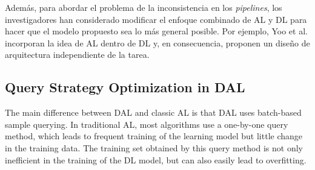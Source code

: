Además, para abordar el problema de la inconsistencia en los \textit{pipelines}, los investigadores han considerado modificar el enfoque combinado de AL y DL para hacer que el modelo propuesto sea lo más general posible. Por ejemplo, Yoo et al. \cite{yoo2019learning} incorporan la idea de AL dentro de DL y, en consecuencia, proponen un diseño de arquitectura independiente de la tarea.






\subsection{Query Strategy Optimization in DAL}

The main difference between DAL and classic AL is that DAL uses batch-based sample querying. In traditional AL, most algorithms use a one-by-one query
method, which leads to frequent training of the learning model but little change in the training
data. The training set obtained by this query method is not only inefficient in the training of the
DL model, but can also easily lead to overfitting.

